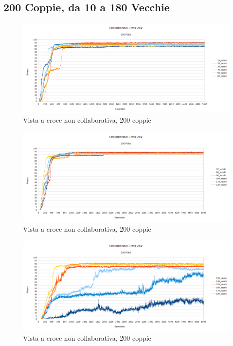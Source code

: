 \subsection{200 Coppie, da 10 a 180 Vecchie}
\begin{figure}[ht]
	\centering
	\includegraphics[scale=0.7,angle=90]{imgs/uncollaborative_cross_200_pairs_10_60_vecchi.png}
	\caption{Vista a croce non collaborativa, 200 coppie}
	\label{figure:uncoll_cross_200_10_60}
\end{figure}
\begin{figure}[ht]
	\centering
	\includegraphics[scale=0.7,angle=90]{imgs/uncollaborative_cross_200_pairs_70_120_vecchi.png}
	\caption{Vista a croce non collaborativa, 200 coppie}
	\label{figure:uncoll_cross_200_70_120}
\end{figure}
\begin{figure}[ht]
	\centering
	\includegraphics[scale=0.7,angle=90]{imgs/uncollaborative_cross_200_pairs_130_180_vecchi.png}
	\caption{Vista a croce non collaborativa, 200 coppie}
	\label{figure:uncoll_cross_200_130_180}
\end{figure}
